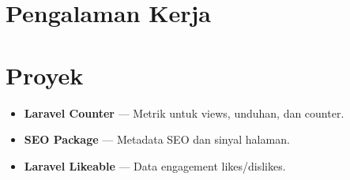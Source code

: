 \documentclass[11pt,a4paper]{article}
\begin{document}

\section*{Pengalaman Kerja}

\section*{Proyek}
\begin{itemize}
  \item \textbf{Laravel Counter} --- Metrik untuk views, unduhan, dan counter.
  \item \textbf{SEO Package} --- Metadata SEO dan sinyal halaman.
  \item \textbf{Laravel Likeable} --- Data engagement likes/dislikes.
\end{itemize}

\end{document}
